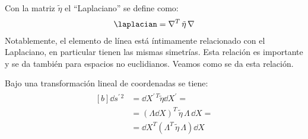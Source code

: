 Con la matriz $\tilde{\eta}$ el \enquote{Laplaciano} se define como:
\begin{align}
\laplacian = \nabla^{T} \, \tilde{\eta} \, \nabla
\label{eq:ecuacion_10_022}
\end{align}
Notablemente, el elemento de línea está íntimamente relacionado con el Laplaciano, en particular tienen las mismas simetrías. Esta relación es importante y se da también para espacios no euclidianos. Veamos como se da esta relación.
\par
Bajo una transformación lineal de coordenadas se tiene:
\begin{align}
\begin{aligned}[b]
\dd{s^{\prime \, 2}} &= \dd{X^{\prime \, T}} \tilde{\eta} \dd{X^{\prime}} = \\[0.5em]
&= \left(\Lambda \dd{X} \right)^{T} \, \tilde{\eta} \, \Lambda \, \dd{X} = \\[0.5em]
&= \dd{X^{T}} \left( \Lambda^{T} \, \tilde{\eta} \, \Lambda \right) \dd{X}
\end{aligned}
\label{eq:ecuacion_10_023}
\end{align}


